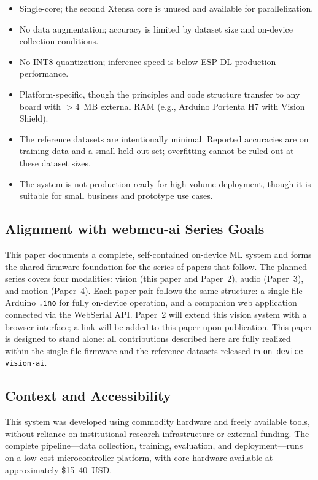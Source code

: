 \documentclass[12pt]{article}
\begin{document}
\begin{itemize}[nosep]
  \item Single-core; the second Xtensa core is unused and available for
        parallelization.
  \item No data augmentation; accuracy is limited by dataset size and on-device
        collection conditions.
  \item No INT8 quantization; inference speed is below ESP-DL production
        performance.
  \item Platform-specific, though the principles and code structure transfer to
        any board with $>$4~MB external RAM (e.g., Arduino Portenta H7 with
        Vision Shield).
  \item The reference datasets are intentionally minimal.
        Reported accuracies are on training data and a small held-out set;
        overfitting cannot be ruled out at these dataset sizes.
  \item The system is not production-ready for high-volume deployment, though it
        is suitable for small business and prototype use cases.
\end{itemize}

\subsection{Alignment with webmcu-ai Series Goals}
\label{subsec:seriesgoals}

This paper documents a complete, self-contained on-device ML system and forms
the shared firmware foundation for the series of papers that follow.
The planned series covers four modalities: vision (this paper and Paper~2),
audio (Paper~3), and motion (Paper~4).
Each paper pair follows the same structure: a single-file Arduino
\texttt{.ino} for fully on-device operation, and a companion web application
connected via the WebSerial API.
Paper~2 will extend this vision system with a browser interface; a link will
be added to this paper upon publication.
This paper is designed to stand alone: all contributions described here are
fully realized within the single-file firmware and the reference datasets
released in \texttt{on-device-vision-ai}.

\subsection{Context and Accessibility}
\label{subsec:context}

This system was developed using commodity hardware and freely available tools,
without reliance on institutional research infrastructure or external funding.
The complete pipeline---data collection, training, evaluation, and
deployment---runs on a low-cost microcontroller platform, with core hardware
available at approximately \$15--40~USD.
\end{document}
